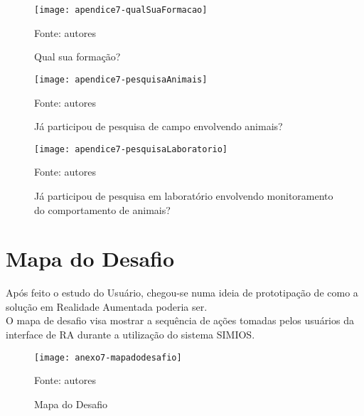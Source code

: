 \begin{figure}[ht]
  \centering
    \caption{Qual sua formação?}
    \texttt{[image: apendice7-qualSuaFormacao]}
	\centerline{\small{Fonte: autores}}
\end{figure}
\FloatBarrier

\begin{figure}[ht]
  \centering
    \caption{Já participou de pesquisa de campo envolvendo animais?}
    \texttt{[image: apendice7-pesquisaAnimais]}
	\centerline{\small{Fonte: autores}}
\end{figure}
\FloatBarrier

\begin{figure}[ht]
  \centering
    \caption{Já participou de pesquisa em laboratório envolvendo monitoramento do comportamento de animais?}
    \texttt{[image: apendice7-pesquisaLaboratorio]}
	\centerline{\small{Fonte: autores}}
\end{figure}
\FloatBarrier

\section{Mapa do Desafio}

Após feito o estudo do Usuário, chegou-se numa ideia de prototipação de como a solução em Realidade Aumentada poderia ser. \\

O mapa de desafio visa mostrar a sequência de ações tomadas pelos usuários da interface de RA durante a utilização do sistema SIMIOS.


\begin{sidewaysfigure}[ht]
  \centering
    \caption{Mapa do Desafio}
    \texttt{[image: anexo7-mapadodesafio]}
	\centerline{\small{Fonte: autores}}
\end{sidewaysfigure}
\FloatBarrier
